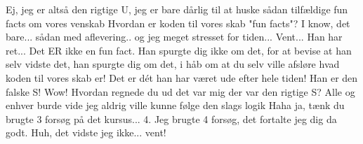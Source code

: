 \documentclass[a4paper,11pt]{article}
\begin{document}
\begin{sketch}
 Ej, jeg er altså den rigtige U, jeg er bare dårlig til at huske sådan tilfældige fun facts om vores venskab
 Hvordan er koden til vores skab "fun facts"?
 I know, det bare... sådan med aflevering.. og jeg meget stresset for tiden...
 Vent... Han har ret... Det ER ikke en fun fact. Han spurgte dig ikke om det, for at bevise at han selv vidste det, han spurgte dig om det, i håb om at du selv ville afsløre hvad koden til vores skab er! Det er dét han har været ude efter hele tiden! Han er den falske S!
  Wow! Hvordan regnede du ud det var mig der var den rigtige S?
  Alle og enhver burde vide jeg aldrig ville kunne følge den slags logik
  Haha ja, tænk du brugte 3 forsøg på det kursus...
 4.  Jeg brugte 4 forsøg, det fortalte jeg dig da godt.
 Huh, det vidste jeg ikke... vent! 
\end{sketch}
\end{document}
